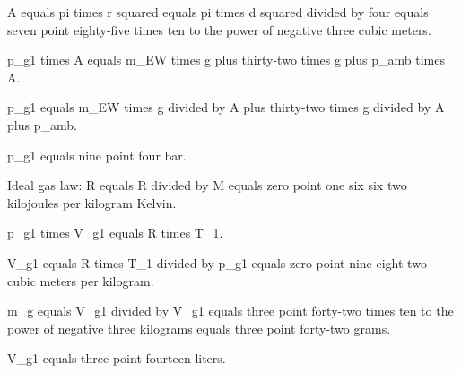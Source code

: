 A equals pi times r squared equals pi times d squared divided by four equals seven point eighty-five times ten to the power of negative three cubic meters.  

p_g1 times A equals m_EW times g plus thirty-two times g plus p_amb times A.  

p_g1 equals m_EW times g divided by A plus thirty-two times g divided by A plus p_amb.  

p_g1 equals nine point four bar.  

Ideal gas law:  
R equals R divided by M equals zero point one six six two kilojoules per kilogram Kelvin.  

p_g1 times V_g1 equals R times T_1.  

V_g1 equals R times T_1 divided by p_g1 equals zero point nine eight two cubic meters per kilogram.  

m_g equals V_g1 divided by V_g1 equals three point forty-two times ten to the power of negative three kilograms equals three point forty-two grams.  

V_g1 equals three point fourteen liters.